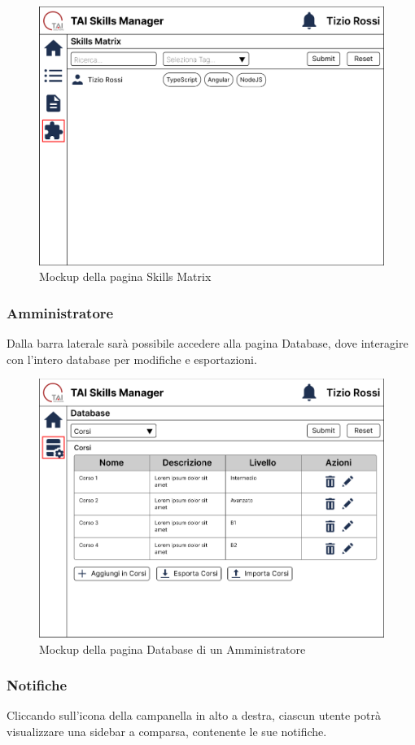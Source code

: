 \begin{figure}[ht!]  
    \centering
        \includegraphics[width=0.7\linewidth]{immagini/mockup/Pagina Skills Matrix Skill User.png}
        \caption{Mockup della pagina Skills Matrix}
        \label{mockup-skills-matrix}
\end{figure}
\FloatBarrier

\subsubsection{Amministratore}
Dalla barra laterale sarà possibile accedere alla pagina Database, dove interagire con l’intero database per modifiche e esportazioni.

\begin{figure}[ht!]  
    \centering
        \includegraphics[width=0.7\linewidth]{immagini/mockup/Pagina Database Admin.png}
        \caption{Mockup della pagina Database di un Amministratore}
        \label{mockup-database}
\end{figure}
\FloatBarrier

\subsubsection{Notifiche}
Cliccando sull’icona della campanella in alto a destra, ciascun utente potrà visualizzare una sidebar a comparsa, contenente le sue notifiche.

